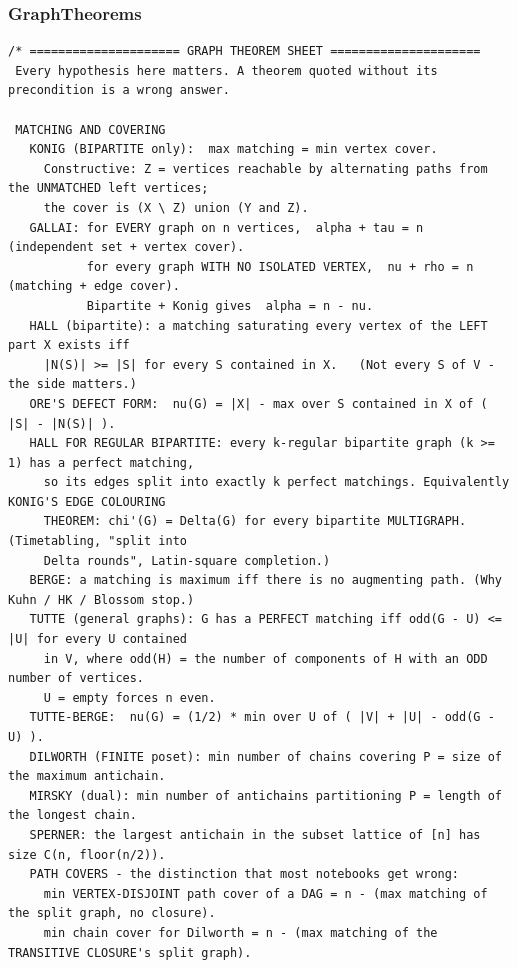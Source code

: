 \documentclass[9pt,a4paper,twocolumn]{extarticle}
\begin{document}
\filbreak
\subsubsection{GraphTheorems}
\nopagebreak
\begin{lstlisting}
/* ===================== GRAPH THEOREM SHEET =====================
 Every hypothesis here matters. A theorem quoted without its precondition is a wrong answer.

 MATCHING AND COVERING
   KONIG (BIPARTITE only):  max matching = min vertex cover.
     Constructive: Z = vertices reachable by alternating paths from the UNMATCHED left vertices;
     the cover is (X \ Z) union (Y and Z).
   GALLAI: for EVERY graph on n vertices,  alpha + tau = n   (independent set + vertex cover).
           for every graph WITH NO ISOLATED VERTEX,  nu + rho = n   (matching + edge cover).
           Bipartite + Konig gives  alpha = n - nu.
   HALL (bipartite): a matching saturating every vertex of the LEFT part X exists iff
     |N(S)| >= |S| for every S contained in X.   (Not every S of V - the side matters.)
   ORE'S DEFECT FORM:  nu(G) = |X| - max over S contained in X of ( |S| - |N(S)| ).
   HALL FOR REGULAR BIPARTITE: every k-regular bipartite graph (k >= 1) has a perfect matching,
     so its edges split into exactly k perfect matchings. Equivalently KONIG'S EDGE COLOURING
     THEOREM: chi'(G) = Delta(G) for every bipartite MULTIGRAPH. (Timetabling, "split into
     Delta rounds", Latin-square completion.)
   BERGE: a matching is maximum iff there is no augmenting path. (Why Kuhn / HK / Blossom stop.)
   TUTTE (general graphs): G has a PERFECT matching iff odd(G - U) <= |U| for every U contained
     in V, where odd(H) = the number of components of H with an ODD number of vertices.
     U = empty forces n even.
   TUTTE-BERGE:  nu(G) = (1/2) * min over U of ( |V| + |U| - odd(G - U) ).
   DILWORTH (FINITE poset): min number of chains covering P = size of the maximum antichain.
   MIRSKY (dual): min number of antichains partitioning P = length of the longest chain.
   SPERNER: the largest antichain in the subset lattice of [n] has size C(n, floor(n/2)).
   PATH COVERS - the distinction that most notebooks get wrong:
     min VERTEX-DISJOINT path cover of a DAG = n - (max matching of the split graph, no closure).
     min chain cover for Dilworth = n - (max matching of the TRANSITIVE CLOSURE's split graph).


\end{lstlisting}
\end{document}
